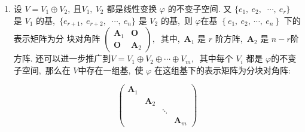 \begin{enumerate}
		\item 设 $ V=V_{1} \oplus V_{2} ,\  $且$  V_{1},\  V_{2} $ 都是线性变换  $\varphi $ 的不变子空间. 又  $\{e_{1},\  e_{2},\ $ $\cdots,\  e_{r}\}$  是 $ V_{1} $ 的基,\  $ \{e_{r+1},\  e_{r+2},\ $ $\cdots,\  e_{n}\} $ 是  $V_{2}$  的基,\  则  $\varphi  $在基 $ \left\{e_{1},\  e_{2},\  \cdots,\  e_{n}\right\}$  下的表示矩阵为分 块对角阵  $\left(\begin{array}{cc}\boldsymbol{A}_{1} & \boldsymbol{O} \\ \boldsymbol{O} & \boldsymbol{A}_{2}\end{array}\right) ,\ $ 其中,\ $  \boldsymbol{A}_{1} $ 是  $r $ 阶方阵,\ $  \boldsymbol{A}_{2} $ 是  $n-r  $阶方阵.
		还可以进一步推广到$ V=V_{1} \oplus V_{2} \oplus \cdots \oplus V_{m} ,\ $ 其中每个 $ V_{i}$  都是 $ \varphi  $的不变子空间,\  那么在  $V  $中存在一组基,\  使 $ \varphi $ 在这组基下的表示矩阵为分块对角阵:
		
		$$\left(\begin{array}{llll}
			\boldsymbol{A}_{1} & & & \\
			& \boldsymbol{A}_{2} & & \\
			& & \ddots & \\
			& & & \boldsymbol{A}_{m}
		\end{array}\right)$$
		

\end{enumerate}
